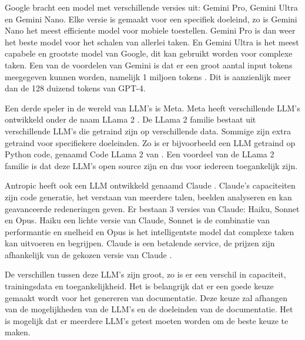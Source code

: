 Google \autocite{Google2024} bracht een model met verschillende versies uit: Gemini Pro, Gemini Ultra en Gemini Nano. 
Elke versie is gemaakt voor een specifiek doeleind, zo is Gemini Nano het meest efficiente model voor mobiele toestellen. Gemini Pro is dan weer het beste model voor het schalen van allerlei taken.
En Gemini Ultra is het meest capabele en grootste model van Google, dit kan gebruikt worden voor complexe taken.
Een van de voordelen van Gemini is dat er een groot aantal input tokens meegegeven kunnen worden, namelijk 1 miljoen tokens \autocite{Google2024}.
Dit is aanzienlijk meer dan de 128 duizend tokens van GPT-4.

Een derde speler in de wereld van LLM's is Meta. Meta heeft verschillende LLM's ontwikkeld onder de naam LLama 2 \autocite{Meta2024}.
De LLama 2 familie bestaat uit verschillende LLM's die getraind zijn op verschillende data. Sommige zijn extra getraind voor specifiekere doeleinden.
Zo is er bijvoorbeeld een LLM getraind op Python code, genaamd Code LLama 2 van \textcite{Roziere2024}.
Een voordeel van de LLama 2 familie is dat deze LLM's open source zijn en dus voor iedereen toegankelijk zijn.

Antropic heeft ook een LLM ontwikkeld genaamd Claude \autocite{Anthropic2023}. 
Claude's capaciteiten zijn code generatie, het verstaan van meerdere talen, beelden analyseren en kan geavanceerde redeneringen geven.
Er bestaan 3 versies van Claude: Haiku, Sonnet en Opus.
Haiku een lichte versie van Claude, Sonnet is de combinatie van performantie en snelheid en Opus is het intelligentste model dat complexe taken kan uitvoeren en begrijpen.
Claude is een betalende service, de prijzen zijn afhankelijk van de gekozen versie van Claude \autocite{Anthropic2023}.

De verschillen tussen deze LLM's zijn groot, zo is er een verschil in capaciteit, trainingsdata en toegankelijkheid.
Het is belangrijk dat er een goede keuze gemaakt wordt voor het genereren van documentatie.
Deze keuze zal afhangen van de mogelijkheden van de LLM's en de doeleinden van de documentatie.
Het is mogelijk dat er meerdere LLM's getest moeten worden om de beste keuze te maken.

